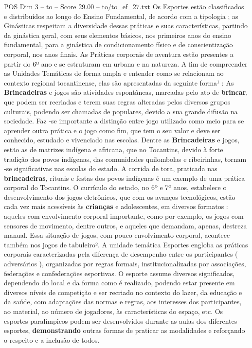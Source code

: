 \begin{textsample}{POS Dim 3 – to – Score 29.00 – to/to\_ef\_27.txt}
Os Esportes estão classificados e distribuídos ao longo do Ensino Fundamental, de acordo com a tipologia ; as Ginásticas respeitam a diversidade dessas práticas e suas características, partindo da ginástica geral, com seus elementos básicos, nos primeiros anos do ensino fundamental, para a ginástica de condicionamento físico e de conscientização corporal, nos anos finais.
As Práticas corporais de aventura estão presentes a partir do 6º ano e se estruturam em urbana e na natureza.
A fim de compreender as Unidades Temáticas de forma ampla e entender como se relacionam ao contexto regional tocantinense, elas são apresentadas da seguinte forma¹ : As \textbf{Brincadeiras} e jogos são atividades espontâneas, marcadas pelo ato de \textbf{brincar}, que podem ser recriadas e terem suas regras alteradas pelos diversos grupos culturais, podendo ser chamadas de populares, devido a sua grande difusão na sociedade.
Faz -se importante a distinção entre jogo utilizado como meio para se aprender outra prática e o jogo como fim, que tem o seu valor e deve ser conhecido, estudado e vivenciado nas escolas.
Dentre as \textbf{Brincadeiras} e jogos, estão as de matrizes indígena e africana, que no Tocantins, devido à forte tradição dos povos indígenas, das comunidades quilombolas e ribeirinhas, tornam -se significativas nas escolas do estado.
A corrida de tora, praticada nas \textbf{brincadeiras}, rituais e festas dos povos indígenas é um exemplo de uma prática corporal do Tocantins.
O currículo do estado, no 6º e 7º anos, estabelece o desenvolvimento dos jogos eletrônicos, que com os avanços tecnológicos, estão cada vez mais acessíveis às \textbf{crianças} e adolescentes, em diversos formatos : aqueles com envolvimento corporal importante, como por exemplo, os jogos com sensores de movimento, dentre outros, e aqueles que demandam, apenas, destreza manual.
Essa situação de jogos, com pouco envolvimento corporal, acontece também nos jogos de tabuleiro².
A unidade temática Esportes engloba as práticas corporais caracterizadas pela diferença de desempenho entre os participantes ( adversários ), organizadas por regras formais, institucionalizadas por associações, federações e confederações esportivas.
O esporte assume diversos significados, dependendo do local e da forma como é realizado, podendo estar presente em diversos níveis de competição e ser recriado no contexto do lazer, da educação e da saúde, com adaptações das normas e regras, aos interesses dos participantes, ao material, ao número de jogadores, às características do espaço, etc.
Os esportes paralímpicos podem ser desenvolvidos durante as aulas dos diferentes esportes, \textbf{demonstrando} outras formas de praticar as modalidades e reforçando o respeito e a inclusão de todos.

\end{textsample}
